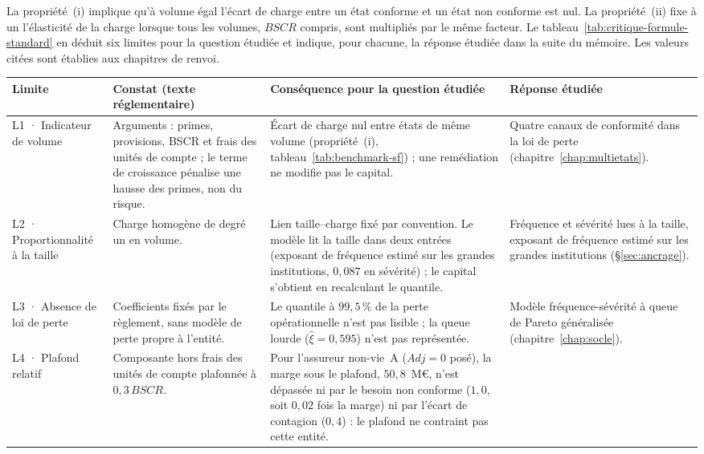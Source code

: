 La propriété~(i) implique qu'à volume égal l'écart de charge entre un état conforme et un état non
conforme est nul. La propriété~(ii) fixe à un l'élasticité de la charge lorsque tous les volumes,
$BSCR$ compris, sont multipliés par le même facteur. Le
tableau~\ref{tab:critique-formule-standard} en déduit six limites pour la question étudiée et
indique, pour chacune, la réponse étudiée dans la suite du mémoire. Les valeurs citées
sont établies aux chapitres de renvoi.

\begin{table}[H]\centering\small
\begingroup
{}
\renewcommand{\arraystretch}{1.28}
\begin{tabularx}{\textwidth}{@{}>{\raggedright\arraybackslash}p{}>{\raggedright\arraybackslash}X>{\raggedright\arraybackslash}X>{\raggedright\arraybackslash}X@{}}
\toprule
\textbf{Limite} & \textbf{Constat (texte réglementaire)} & \textcolor{reperecritique}{\textbf{Conséquence pour la question étudiée}} & \textcolor{reperereponse}{\textbf{Réponse étudiée}} \\
\midrule
L1 · Indicateur de volume
& Arguments : primes, provisions, BSCR et frais des unités de compte ; le terme de croissance pénalise une hausse des primes, non du risque.
& Écart de charge nul entre états de même volume (propriété~(i), tableau~\ref{tab:benchmark-sf}) ; une remédiation ne modifie pas le capital.
& Quatre canaux de conformité dans la loi de perte (chapitre~\ref{chap:multietats}). \\
\addlinespace
L2 · Proportionnalité à la taille
& Charge homogène de degré un en volume.
& Lien taille--charge fixé par convention. Le modèle lit la taille dans deux entrées (exposant de fréquence estimé sur les grandes institutions, $0{,}087$ en sévérité) ; le capital s'obtient en recalculant le quantile.
& Fréquence et sévérité lues à la taille, exposant de fréquence estimé sur les grandes institutions (\S\ref{sec:ancrage}). \\
\addlinespace
L3 · Absence de loi de perte
& Coefficients fixés par le règlement, sans modèle de perte propre à l'entité.
& Le quantile à $99{,}5\,\%$ de la perte opérationnelle n'est pas lisible ; la queue lourde ($\hat\xi=0{,}595$) n'est pas représentée.
& Modèle fréquence-sévérité à queue de Pareto généralisée (chapitre~\ref{chap:socle}). \\
\addlinespace
L4 · Plafond relatif
& Composante hors frais des unités de compte plafonnée à $0{,}3\,BSCR$.
& Pour l'assureur non-vie~A ($Adj=0$ posé), la marge sous le plafond, $50{,}8$~M\euro, n'est dépassée ni par le besoin non conforme ($1{,}0$, soit $0{,}02$ fois la marge) ni par l'écart de contagion ($0{,}4$) : le plafond ne contraint pas cette entité.

\end{tabularx}
\end{table}
